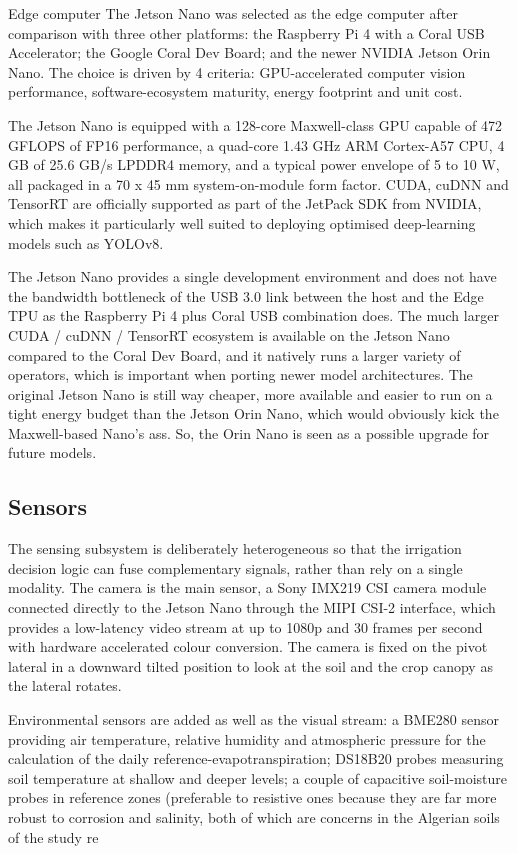 \documentclass[12pt,a4paper]{report}
\begin{document}
Edge computer The Jetson Nano was selected as the edge computer after comparison with three other platforms: the Raspberry Pi 4 with a Coral USB Accelerator; the Google Coral Dev Board; and the newer NVIDIA Jetson Orin Nano. The choice is driven by 4 criteria: GPU-accelerated computer vision performance, software-ecosystem maturity, energy footprint and unit cost.

The Jetson Nano is equipped with a 128-core Maxwell-class GPU capable of 472 GFLOPS of FP16 performance, a quad-core 1.43 GHz ARM Cortex-A57 CPU, 4 GB of 25.6 GB/s LPDDR4 memory, and a typical power envelope of 5 to 10 W, all packaged in a 70 x 45 mm system-on-module form factor. CUDA, cuDNN and TensorRT are officially supported as part of the JetPack SDK from NVIDIA, which makes it particularly well suited to deploying optimised deep-learning models such as YOLOv8.

The Jetson Nano provides a single development environment and does not have the bandwidth bottleneck of the USB 3.0 link between the host and the Edge TPU as the Raspberry Pi 4 plus Coral USB combination does. The much larger CUDA / cuDNN / TensorRT ecosystem is available on the Jetson Nano compared to the Coral Dev Board, and it natively runs a larger variety of operators, which is important when porting newer model architectures. The original Jetson Nano is still way cheaper, more available and easier to run on a tight energy budget than the Jetson Orin Nano, which would obviously kick the Maxwell-based Nano's ass. So, the Orin Nano is seen as a possible upgrade for future models.

\subsection{Sensors}

The sensing subsystem is deliberately heterogeneous so that the irrigation decision logic can fuse complementary signals, rather than rely on a single modality. The camera is the main sensor, a Sony IMX219 CSI camera module connected directly to the Jetson Nano through the MIPI CSI-2 interface, which provides a low-latency video stream at up to 1080p and 30 frames per second with hardware accelerated colour conversion. The camera is fixed on the pivot lateral in a downward tilted position to look at the soil and the crop canopy as the lateral rotates.

Environmental sensors are added as well as the visual stream: a BME280 sensor providing air temperature, relative humidity and atmospheric pressure for the calculation of the daily reference-evapotranspiration; DS18B20 probes measuring soil temperature at shallow and deeper levels; a couple of capacitive soil-moisture probes in reference zones (preferable to resistive ones because they are far more robust to corrosion and salinity, both of which are concerns in the Algerian soils of the study re
\end{document}
